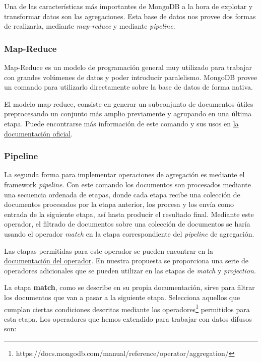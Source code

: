 Una de las características más importantes de MongoDB a la hora de explotar y transformar datos son las agregaciones. Esta base de datos nos provee dos formas de realizarla, mediante \textit{map-reduce} y mediante \textit{pipeline}.

\subsubsection{Map-Reduce}\label{mapreduce}

Map-Reduce es un modelo de programación general muy utilizado para trabajar con grandes volúmenes de datos y poder introducir paralelismo. MongoDB provee un comando para utilizarlo directamente sobre la base de datos de forma nativa.

El modelo map-reduce, consiste en generar un subconjunto de documentos útiles preprocesando un conjunto más amplio previamente y agrupando en una última etapa. Puede encontrarse más información de este comando y sus usos en \href{https://docs.mongodb.com/manual/core/map-reduce/}{la documentación oficial}.

\subsubsection{Pipeline}\label{pipeline}

La segunda forma para implementar operaciones de agregación es mediante el framework \textit{pipeline}. Con este comando los documentos son procesados mediante una secuencia ordenada de etapas, donde cada etapa recibe una colección de documentos procesados por la etapa anterior, los procesa y los envía como entrada de la siguiente etapa, así hasta producir el resultado final. Mediante este operador, el filtrado de documentos sobre una colección de documentos se haría usando el operador \textit{match} en la etapa correspondiente del \textit{pipeline} de agregación.

Las etapas permitidas para este operador se pueden encontrar en la \href{https://docs.mongodb.com/manual/reference/operator/aggregation-pipeline/}{documentación del operador}. En nuestra propuesta se proporciona una serie de operadores adicionales que se pueden utilizar en las etapas de \textit{match} y \textit{projection}.

La etapa \textbf{match}, como se describe en su propia documentación, sirve para filtrar los documentos que van a pasar a la siguiente etapa. Selecciona aquellos que cumplan ciertas condiciones descritas mediante los operadores\footnote{https://docs.mongodb.com/manual/reference/operator/aggregation/} permitidos para esta etapa. Los operadores que hemos extendido para trabajar con datos difusos son:

